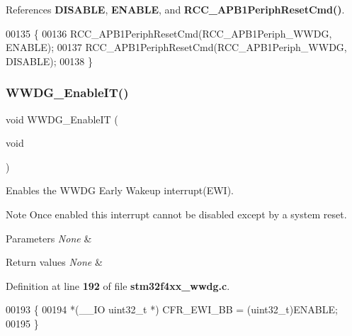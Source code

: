 References \textbf{ D\+I\+S\+A\+B\+LE}, \textbf{ E\+N\+A\+B\+LE}, and \textbf{ R\+C\+C\+\_\+\+A\+P\+B1\+Periph\+Reset\+Cmd()}.


\begin{DoxyCode}
00135 \{
00136   RCC_APB1PeriphResetCmd(RCC_APB1Periph_WWDG, ENABLE);
00137   RCC_APB1PeriphResetCmd(RCC_APB1Periph_WWDG, DISABLE);
00138 \}
\end{DoxyCode}
\mbox{\label{group__WWDG__Group1_gac8af66ea5254d3d78b60b9b7c7f29521}} 
\subsubsection{W\+W\+D\+G\+\_\+\+Enable\+I\+T()}
{\footnotesize\ttfamily void W\+W\+D\+G\+\_\+\+Enable\+IT (\begin{DoxyParamCaption}\item[{void}]{ }\end{DoxyParamCaption})}



Enables the W\+W\+DG Early Wakeup interrupt(\+E\+W\+I). 

\begin{DoxyNote}{Note}
Once enabled this interrupt cannot be disabled except by a system reset. 
\end{DoxyNote}

\begin{DoxyParams}{Parameters}
{\em None} & \\
\hline
\end{DoxyParams}

\begin{DoxyRetVals}{Return values}
{\em None} & \\
\hline
\end{DoxyRetVals}


Definition at line \textbf{ 192} of file \textbf{ stm32f4xx\+\_\+wwdg.\+c}.


\begin{DoxyCode}
00193 \{
00194   *(\_\_IO uint32\_t *) CFR_EWI_BB = (uint32\_t)ENABLE;
00195 \}
\end{DoxyCode}
\mbox{\label{group__WWDG__Group1_ga6e44cc35f133b28b9ad861f459bf8d76}} 
